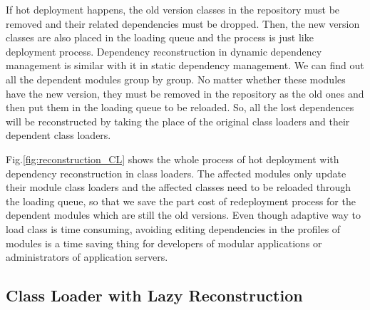 \documentclass[conference]{IEEEtran}
\begin{document}
If hot deployment happens, the old version classes in the repository must be removed and their related dependencies must be dropped. 
Then, the new version classes are also placed in the loading queue and the process is just like deployment process. 
Dependency reconstruction in dynamic dependency management is similar with it in static dependency management. 
We can find out all the dependent modules group by group. 
No matter whether these modules have the new version, they must be removed in the repository as the old ones and then put them in the loading queue to be reloaded. 
So, all the lost dependences will be reconstructed by taking the place of the original class loaders and their dependent class loaders. 

Fig.\ref{fig:reconstruction_CL} shows the whole process of hot deployment with dependency reconstruction in class loaders. 
The affected modules only update their module class loaders and the affected classes need to be reloaded through the loading queue, so that we save the part cost of redeployment process for the dependent modules which are still the old versions. 
Even though adaptive way to load class is time consuming, avoiding editing dependencies in the profiles of modules is a time saving thing for developers of modular applications or administrators of application servers.


\subsection{Class Loader with Lazy Reconstruction}
\end{document}
